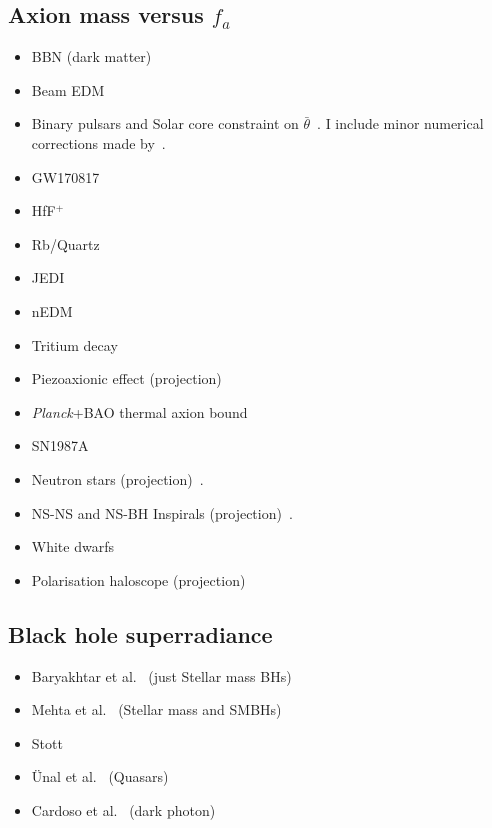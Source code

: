 \documentclass[8pt,twocolumn]{extarticle}
\begin{document}
\begin{mdframed}
\vspace{-1em}
\section{Axion mass versus $f_a$}\vspace{-0.5em}
\begin{itemize}\setlength\itemsep{-0.5em}
	\item BBN (dark matter)~\cite{Blum:2014vsa}
	\item Beam EDM~\cite{Schulthess:2022pbp}
	\item Binary pulsars and Solar core constraint on $\bar{\theta}$~\cite{Hook:2017psm}. I include minor numerical corrections made by~\cite{DiLuzio:2021gos,DiLuzio:2021pxd}.
	\item GW170817~\cite{Zhang:2021mks}
	\item HfF$^+$~\cite{Roussy:2020ily}
		\item Rb/Quartz~\cite{Zhang:2022ewz}
		\item JEDI~\cite{JEDI:2022hxa}
	\item nEDM~\cite{Abel:2017rtm}
	\item Tritium decay~\cite{Zhang:2023lem}
	\item Piezoaxionic effect (projection)~\cite{Arvanitaki:2021wjk}
		\item \emph{Planck}+BAO thermal axion bound~\cite{Caloni:2022uya}
	\item SN1987A~\cite{Lucente:2022vuo}
	\item Neutron stars (projection)~\cite{Hook:2017psm}.
	\item NS-NS and NS-BH Inspirals (projection)~\cite{Hook:2017psm}.
	\item White dwarfs~\cite{Balkin:2022qer}
	\item Polarisation haloscope (projection)~\cite{Berlin:2022mia}

\end{itemize}

\subsection{Black hole superradiance}\vspace{-0.5em}
\begin{itemize}\setlength\itemsep{-0.5em}
	\item Baryakhtar et al.~\cite{Baryakhtar:2020gao} (just Stellar mass BHs)
	\item Mehta et al.~\cite{Baryakhtar:2020gao} (Stellar mass and SMBHs)
	\item Stott~\cite{Stott:2020gjj}
	\item \"Unal et al.~\cite{Unal:2020jiy} (Quasars)
	\item Cardoso et al.~\cite{Cardoso:2018tly} (dark photon)
\end{itemize}


\end{mdframed}
\end{document}
